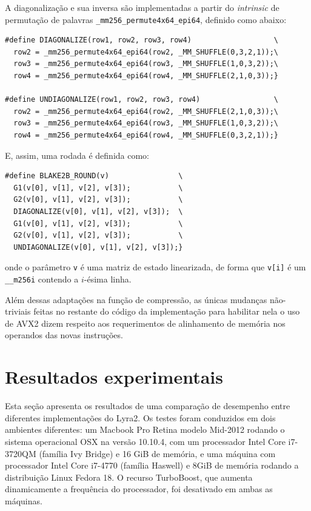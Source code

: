 \documentclass{article}
\begin{document}
A diagonalização e sua inversa são implementadas a partir do \emph{intrinsic}
de permutação de palavras \texttt{\_mm256\_permute4x64\_epi64}, definido como abaixo:

\begin{small}
\begin{verbatim}
#define DIAGONALIZE(row1, row2, row3, row4)                   \
  row2 = _mm256_permute4x64_epi64(row2, _MM_SHUFFLE(0,3,2,1));\
  row3 = _mm256_permute4x64_epi64(row3, _MM_SHUFFLE(1,0,3,2));\
  row4 = _mm256_permute4x64_epi64(row4, _MM_SHUFFLE(2,1,0,3));}

#define UNDIAGONALIZE(row1, row2, row3, row4)                 \
  row2 = _mm256_permute4x64_epi64(row2, _MM_SHUFFLE(2,1,0,3));\
  row3 = _mm256_permute4x64_epi64(row3, _MM_SHUFFLE(1,0,3,2));\
  row4 = _mm256_permute4x64_epi64(row4, _MM_SHUFFLE(0,3,2,1));}
\end{verbatim}
\end{small}

E, assim, uma rodada é definida como:

\begin{small}
\begin{verbatim}
#define BLAKE2B_ROUND(v)                \
  G1(v[0], v[1], v[2], v[3]);           \
  G2(v[0], v[1], v[2], v[3]);           \
  DIAGONALIZE(v[0], v[1], v[2], v[3]);  \
  G1(v[0], v[1], v[2], v[3]);           \
  G2(v[0], v[1], v[2], v[3]);           \
  UNDIAGONALIZE(v[0], v[1], v[2], v[3]);}
\end{verbatim}
\end{small}
onde o parâmetro \texttt{v} é uma matriz de estado linearizada, de forma
que \texttt{v[i]} é um \texttt{\_\_m256i} contendo a $i$-ésima linha.

Além dessas adaptações na função de compressão, as únicas mudanças
não-triviais feitas no restante do código da implementação para
habilitar nela o uso de AVX2 dizem respeito aos requerimentos de
alinhamento de memória nos operandos das novas instruções.

\section{Resultados experimentais }
\label{sec-experimental}

Esta seção apresenta os resultados de uma comparação de desempenho entre
diferentes implementações do Lyra2. Os testes foram conduzidos em
dois ambientes diferentes: um Macbook Pro Retina modelo Mid-2012 rodando
o sistema operacional OSX na versão 10.10.4, com um processador Intel
Core i7-3720QM (família Ivy Bridge) e 16 GiB de memória, e uma máquina
com processador Intel Core i7-4770 (família Haswell) e 8GiB de memória
rodando a distribuição Linux Fedora 18. O recurso TurboBoost, que
aumenta dinamicamente a frequência do processador, foi desativado em
ambas as máquinas.
\end{document}
